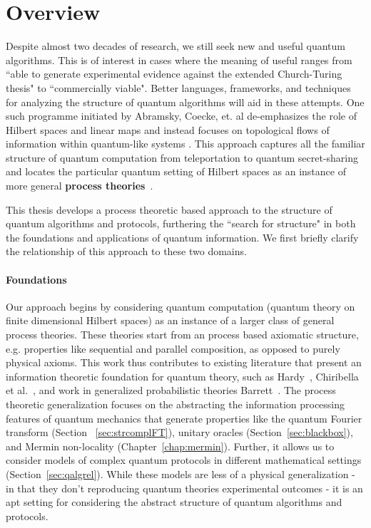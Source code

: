 \chapter{Overview}

Despite almost two decades of research, we still seek new and useful quantum algorithms.  This is of interest in cases where the meaning of useful ranges from ``able to generate experimental evidence against the extended Church-Turing thesis" to ``commercially viable". Better languages, frameworks, and techniques for analyzing the structure of quantum algorithms will aid in these attempts.  One such  programme initiated by Abramsky, Coecke, et. al de-emphasizes the role of Hilbert spaces and linear maps and instead focuses on topological flows of information within quantum-like systems
\cite{abramsky2008categorical,coecke2011interacting,coecke2013new}. This approach captures all the familiar structure of quantum computation from teleportation  to quantum secret-sharing and locates the particular quantum setting of Hilbert spaces as an instance of more general
\textbf{process theories}~\cite{coecke2015generalised,qcs-notes,coecke2011categories}. 

This thesis develops a process theoretic based approach to the structure of quantum algorithms and protocols, furthering the ``search for structure" in both the foundations and applications of quantum information. We first briefly clarify the relationship of this approach to these two domains.
 
\subsubsection*{Foundations}

Our approach begins by considering quantum computation (quantum theory on finite dimensional Hilbert spaces) as an instance of a larger class of general process theories. These theories start from an process based axiomatic structure, e.g. properties like sequential and parallel composition, as opposed to purely physical axioms. This work thus contributes to existing literature that present an information theoretic foundation for quantum theory, such as Hardy~\cite{hardy2001quantum}, Chiribella et al.~\cite{chiribella2011informational}, and work in generalized probabilistic theories Barrett~\cite{barrett2007information}.  The process theoretic generalization focuses on the abstracting the information processing features of quantum mechanics that generate properties like the quantum Fourier transform (Section ~\ref{sec:strcomplFT}), unitary oracles (Section~\ref{sec:blackbox}), and Mermin non-locality (Chapter~\ref{chap:mermin}). Further, it allows us to consider models of complex quantum protocols in different mathematical settings (Section~\ref{sec:qalgrel}). While these models are less of a physical generalization - in that they don't reproducing quantum theories experimental outcomes - it is an apt setting for considering the abstract structure of quantum algorithms and protocols.

